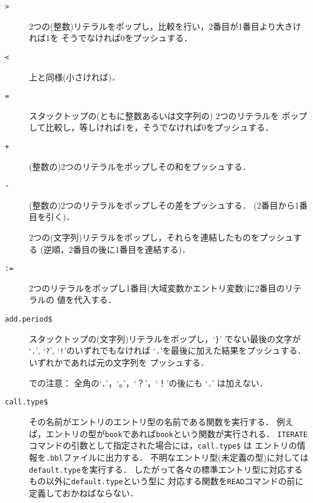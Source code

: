 \begin{description}

\item[\hbox{\tt >}\hfill]
2つの(整数)リテラルをポップし，比較を行い，2番目が1番目より大きければ1を
そうでなければ0をプッシュする．

\item[\hbox{\tt <}\hfill]
上と同様(小さければ)．

\item[\hbox{\tt =}\hfill]
スタックトップの(ともに整数あるいは文字列の) 2つのリテラルを
ポップして比較し，等しければ1を，そうでなければ0をプッシュする．

\item[\hbox{\tt +}\hfill]
(整数の)2つのリテラルをポップしその和をプッシュする．

\item[\hbox{\tt -}\hfill]
(整数の)2つのリテラルをポップしその差をプッシュする．
(2番目から1番目を引く)．

\item[\hbox{\tt *}\hfill]
2つの(文字列)リテラルをポップし，それらを連結したものをプッシュする
(逆順，2番目の後に1番目を連結する)．

\item[\hbox{\tt :=}\hfill]
2つのリテラルをポップし1番目(大域変数かエントリ変数)に2番目のリテラルの
値を代入する．

\item[\hbox{\tt add.period\$}\hfill]
スタックトップの(文字列)リテラルをポップし，`{\tt \}}' でない最後の文字が
`{\tt .}'$\!$, `{\tt ?}'$\!$, `{\tt !}'のいずれでもなければ
`{\tt .}'を最後に加えた結果をプッシュする．いずれかであれば元の文字列を
プッシュする．

{\dg \JBibTeX での注意}：
全角の`．'，`。'，`？'，`！'の後にも `{\tt .}' は加えない．

\item[\hbox{\tt call.type\$}\hfill]
その名前がエントリのエントリ型の名前である関数を実行する．
例えば，エントリの型が{\tt book}であれば{\tt book}という関数が実行される．
{\tt ITERATE}コマンドの引数として指定された場合には，{\tt call.type\$} は
エントリの情報を{\tt .bbl}ファイルに出力する．
不明なエントリ型(未定義の型)に対しては{\tt default.type}を実行する．
したがって各々の標準エントリ型に対応するもの以外に{\tt default.type}という型に
対応する関数を{\tt READ}コマンドの前に定義しておかねばならない．


\end{description}
